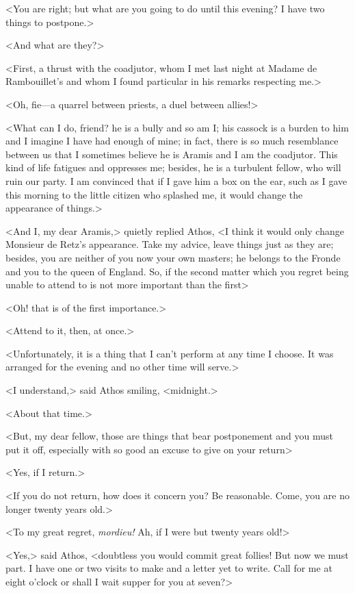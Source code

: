 <You are right; but what are you going to do until this evening? I have two things to postpone.>

<And what are they?>

<First, a thrust with the coadjutor, whom I met last night at Madame de Rambouillet's and whom I found particular in his remarks respecting me.>

<Oh, fie—a quarrel between priests, a duel between allies!>

<What can I do, friend? he is a bully and so am I; his cassock is a burden to him and I imagine I have had enough of mine; in fact, there is so much resemblance between us that I sometimes believe he is Aramis and I am the coadjutor. This kind of life fatigues and oppresses me; besides, he is a turbulent fellow, who will ruin our party. I am convinced that if I gave him a box on the ear, such as I gave this morning to the little citizen who splashed me, it would change the appearance of things.>

<And I, my dear Aramis,> quietly replied Athos, <I think it would only change Monsieur de Retz's appearance. Take my advice, leave things just as they are; besides, you are neither of you now your own masters; he belongs to the Fronde and you to the queen of England. So, if the second matter which you regret being unable to attend to is not more important than the first\longdash>

<Oh! that is of the first importance.>

<Attend to it, then, at once.>

<Unfortunately, it is a thing that I can't perform at any time I choose. It was arranged for the evening and no other time will serve.>

<I understand,> said Athos smiling, <midnight.>

<About that time.>

<But, my dear fellow, those are things that bear postponement and you must put it off, especially with so good an excuse to give on your return\longdash>

<Yes, if I return.>

<If you do not return, how does it concern you? Be reasonable. Come, you are no longer twenty years old.>

<To my great regret, \textit{mordieu!} Ah, if I were but twenty years old!>

<Yes,> said Athos, <doubtless you would commit great follies! But now we must part. I have one or two visits to make and a letter yet to write. Call for me at eight o'clock or shall I wait supper for you at seven?>

